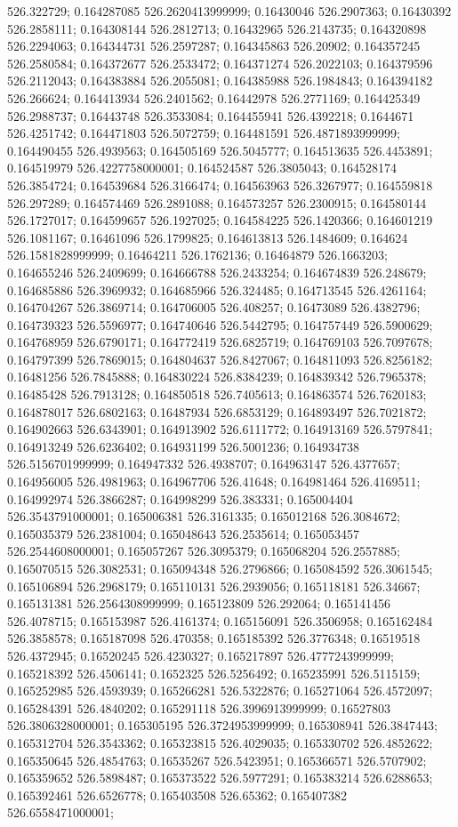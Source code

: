 526.322729; 0.164287085 526.2620413999999; 0.16430046 526.2907363; 0.16430392 526.2858111; 0.164308144 526.2812713; 0.16432965 526.2143735; 0.164320898 526.2294063; 0.164344731 526.2597287; 0.164345863 526.20902; 0.164357245 526.2580584; 0.164372677 526.2533472; 0.164371274 526.2022103; 0.164379596 526.2112043; 0.164383884 526.2055081; 0.164385988 526.1984843; 0.164394182 526.266624; 0.164413934 526.2401562; 0.16442978 526.2771169; 0.164425349 526.2988737; 0.16443748 526.3533084; 0.164455941 526.4392218; 0.1644671 526.4251742; 0.164471803 526.5072759; 0.164481591 526.4871893999999; 0.164490455 526.4939563; 0.164505169 526.5045777; 0.164513635 526.4453891; 0.164519979 526.4227758000001; 0.164524587 526.3805043; 0.164528174 526.3854724; 0.164539684 526.3166474; 0.164563963 526.3267977; 0.164559818 526.297289; 0.164574469 526.2891088; 0.164573257 526.2300915; 0.164580144 526.1727017; 0.164599657 526.1927025; 0.164584225 526.1420366; 0.164601219 526.1081167; 0.16461096 526.1799825; 0.164613813 526.1484609; 0.164624 526.1581828999999; 0.16464211 526.1762136; 0.16464879 526.1663203; 0.164655246 526.2409699; 0.164666788 526.2433254; 0.164674839 526.248679; 0.164685886 526.3969932; 0.164685966 526.324485; 0.164713545 526.4261164; 0.164704267 526.3869714; 0.164706005 526.408257; 0.16473089 526.4382796; 0.164739323 526.5596977; 0.164740646 526.5442795; 0.164757449 526.5900629; 0.164768959 526.6790171; 0.164772419 526.6825719; 0.164769103 526.7097678; 0.164797399 526.7869015; 0.164804637 526.8427067; 0.164811093 526.8256182; 0.16481256 526.7845888; 0.164830224 526.8384239; 0.164839342 526.7965378; 0.16485428 526.7913128; 0.164850518 526.7405613; 0.164863574 526.7620183; 0.164878017 526.6802163; 0.16487934 526.6853129; 0.164893497 526.7021872; 0.164902663 526.6343901; 0.164913902 526.6111772; 0.164913169 526.5797841; 0.164913249 526.6236402; 0.164931199 526.5001236; 0.164934738 526.5156701999999; 0.164947332 526.4938707; 0.164963147 526.4377657; 0.164956005 526.4981963; 0.164967706 526.41648; 0.164981464 526.4169511; 0.164992974 526.3866287; 0.164998299 526.383331; 0.165004404 526.3543791000001; 0.165006381 526.3161335; 0.165012168 526.3084672; 0.165035379 526.2381004; 0.165048643 526.2535614; 0.165053457 526.2544608000001; 0.165057267 526.3095379; 0.165068204 526.2557885; 0.165070515 526.3082531; 0.165094348 526.2796866; 0.165084592 526.3061545; 0.165106894 526.2968179; 0.165110131 526.2939056; 0.165118181 526.34667; 0.165131381 526.2564308999999; 0.165123809 526.292064; 0.165141456 526.4078715; 0.165153987 526.4161374; 0.165156091 526.3506958; 0.165162484 526.3858578; 0.165187098 526.470358; 0.165185392 526.3776348; 0.16519518 526.4372945; 0.16520245 526.4230327; 0.165217897 526.4777243999999; 0.165218392 526.4506141; 0.1652325 526.5256492; 0.165235991 526.5115159; 0.165252985 526.4593939; 0.165266281 526.5322876; 0.165271064 526.4572097; 0.165284391 526.4840202; 0.165291118 526.3996913999999; 0.16527803 526.3806328000001; 0.165305195 526.3724953999999; 0.165308941 526.3847443; 0.165312704 526.3543362; 0.165323815 526.4029035; 0.165330702 526.4852622; 0.165350645 526.4854763; 0.16535267 526.5423951; 0.165366571 526.5707902; 0.165359652 526.5898487; 0.165373522 526.5977291; 0.165383214 526.6288653; 0.165392461 526.6526778; 0.165403508 526.65362; 0.165407382 526.6558471000001; 